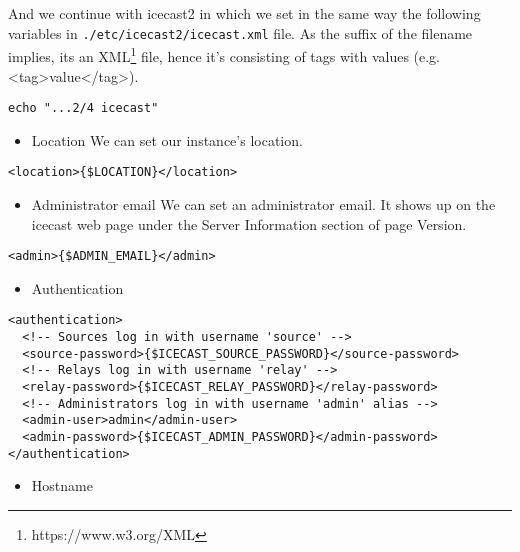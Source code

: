 \documentclass[12pt]{report}
\begin{document}
And we continue with icecast2 in which we set in the same way the
following variables in \texttt{./etc/icecast2/icecast.xml} file. As the
suffix of the filename implies, its an XML\footnote{https://www.w3.org/XML} file, hence it's
consisting of tags with values (e.g. <tag>value</tag>).

\begin{verbatim}
echo "...2/4 icecast"
\end{verbatim}

\begin{itemize}

\item
  Location We can set our instance's location.
\end{itemize}

\begin{verbatim}
<location>{$LOCATION}</location>
\end{verbatim}

\begin{itemize}

\item
  Administrator email We can set an administrator email. It shows up on
  the icecast web page under the Server Information section of page
  Version.
\end{itemize}

\begin{verbatim}
<admin>{$ADMIN_EMAIL}</admin>
\end{verbatim}

\begin{itemize}

\item
  Authentication
\end{itemize}

\begin{verbatim}
<authentication>
  <!-- Sources log in with username 'source' -->
  <source-password>{$ICECAST_SOURCE_PASSWORD}</source-password>
  <!-- Relays log in with username 'relay' -->
  <relay-password>{$ICECAST_RELAY_PASSWORD}</relay-password>
  <!-- Administrators log in with username 'admin' alias -->
  <admin-user>admin</admin-user>
  <admin-password>{$ICECAST_ADMIN_PASSWORD}</admin-password>
</authentication>
\end{verbatim}

\begin{itemize}

\item
  Hostname
\end{itemize}
\end{document}
